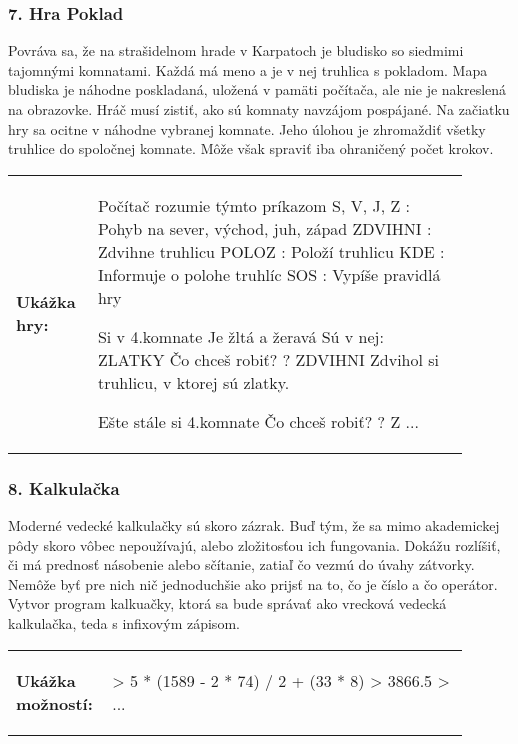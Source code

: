 \subsubsection*{7. Hra Poklad}
Povráva sa, že na strašidelnom hrade v Karpatoch je bludisko so siedmimi tajomnými komnatami. Každá má meno a je v nej truhlica s pokladom. Mapa bludiska je náhodne poskladaná, uložená v pamäti počítača, ale nie je nakreslená na obrazovke. Hráč musí zistiť, ako sú komnaty navzájom pospájané. Na začiatku hry sa ocitne v náhodne vybranej komnate. Jeho úlohou je zhromaždiť všetky truhlice do spoločnej komnate. Môže však spraviť iba ohraničený počet krokov.

\begin{tabular}{@{}p{0.15\linewidth}p{0.75\linewidth}}
\textbf{\small Ukážka hry:} &
\vspace{-3em}
\begin{code}
Počítač rozumie týmto príkazom
S, V, J, Z   : Pohyb na sever, východ, juh, západ
ZDVIHNI		 : Zdvihne truhlicu
POLOZ		 : Položí truhlicu
KDE			 : Informuje o polohe truhlíc
SOS			 : Vypíše pravidlá hry

Si v 4.komnate
Je žltá a žeravá
Sú v nej: ZLATKY
Čo chceš robiť?
? ZDVIHNI
Zdvihol si truhlicu, v ktorej sú zlatky.

Ešte stále si 4.komnate
Čo chceš robiť?
? Z
...
\end{code}
\end{tabular}
\vspace{-2em}

\subsubsection*{8. Kalkulačka}
Moderné vedecké kalkulačky sú skoro zázrak. Buď tým, že sa mimo akademickej pôdy skoro vôbec nepoužívajú, alebo zložitosťou ich fungovania. Dokážu rozlíšiť, či má prednosť násobenie alebo sčítanie, zatiaľ čo vezmú do úvahy zátvorky. Nemôže byť pre nich nič jednoduchšie ako prijsť na to, čo je číslo a čo operátor. Vytvor program kalkuačky, ktorá sa bude správať ako vrecková vedecká kalkulačka, teda s infixovým zápisom.

\begin{tabular}{@{}p{0.15\linewidth}p{0.75\linewidth}}
\textbf{\small Ukážka možností:} &
\vspace{-3em}
\begin{code}
> 5 * (1589 - 2 * 74) / 2 + (33 * 8)
> 3866.5
> ...
\end{code}
\end{tabular}
\vspace{-2em}
